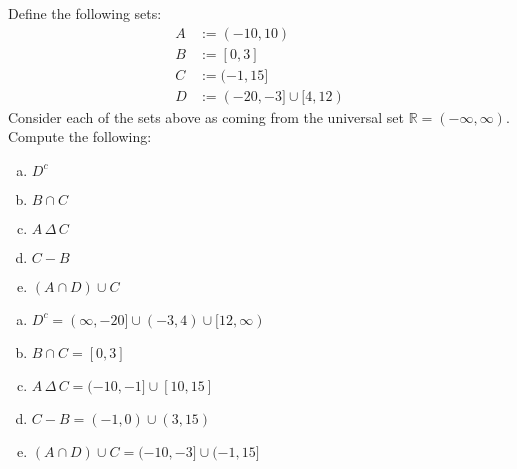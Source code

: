 \documentclass[11pt,letterpaper]{article}
\begin{document}
\newpage



 Define the following sets:
	\[
	\begin{aligned}
	A&:= (-10, 10) \\
	B&:= [0, 3] \\
	C&:= (-1, 15] \\
	D&:= (-20, -3] \cup [4, 12)
	\end{aligned}
	\]
Consider each of the sets above as coming from the universal set $\mathbb{R}= (-\infty, \infty)$. Compute the following:
	\begin{enumerate}[(a)]
	\item $D^c$
	\item $B \cap C$
	\item $A \,\Delta\, C$
	\item $C - B$
	\item $(A \cap D) \cup C$
	\end{enumerate} \pspace

\sol 
\begin{enumerate}[(a)]
\item $D^c= (\infty, -20] \cup (-3, 4) \cup [12, \infty)$
\item $B \cap C= [0, 3]$
\item $A \,\Delta\, C= (-10, -1] \cup [10, 15]$
\item $C - B= (-1, 0) \cup (3, 15)$
\item $(A \cap D) \cup C= (-10, -3] \cup (-1, 15]$
\end{enumerate}
\end{document}
